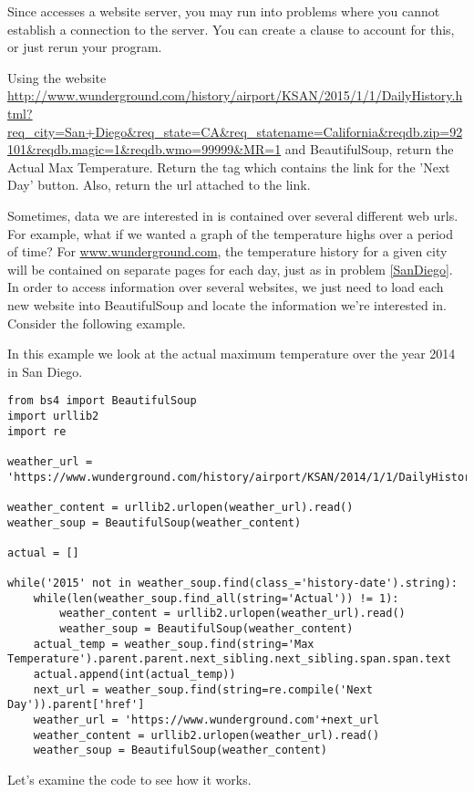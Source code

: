 \begin{warn}
Since  accesses a website server, you may run into problems where you cannot establish a connection to the server.
You can create a  clause to account for this, or just rerun your program.
\end{warn}

\begin{problem}\label{SanDiego}

Using the website \url{http://www.wunderground.com/history/airport/KSAN/2015/1/1/DailyHistory.html?req_city=San+Diego&req_state=CA&req_statename=California&reqdb.zip=92101&reqdb.magic=1&reqdb.wmo=99999&MR=1} 
and BeautifulSoup, return the Actual Max Temperature.
Return the tag which contains the link for the 'Next Day' button.
Also, return the url attached to the link.

\end{problem}

Sometimes, data we are interested in is contained over several different web urls.
For example, what if we wanted a graph of the temperature highs over a period of time?
For \url{www.wunderground.com}, the temperature history for a given city will be contained on separate pages for each day, just as in problem \ref{SanDiego}. In order to access information over several websites, we just need to load each new website into BeautifulSoup and locate the information we're interested in. Consider the following example.

In this example we look at the actual maximum temperature over the year 2014 in San Diego.
\begin{lstlisting}
from bs4 import BeautifulSoup
import urllib2
import re

weather_url = 'https://www.wunderground.com/history/airport/KSAN/2014/1/1/DailyHistory.html'

weather_content = urllib2.urlopen(weather_url).read()
weather_soup = BeautifulSoup(weather_content)

actual = []

while('2015' not in weather_soup.find(class_='history-date').string):
    while(len(weather_soup.find_all(string='Actual')) != 1):
        weather_content = urllib2.urlopen(weather_url).read()
        weather_soup = BeautifulSoup(weather_content)
    actual_temp = weather_soup.find(string='Max Temperature').parent.parent.next_sibling.next_sibling.span.span.text
    actual.append(int(actual_temp))
    next_url = weather_soup.find(string=re.compile('Next Day')).parent['href']
    weather_url = 'https://www.wunderground.com'+next_url
    weather_content = urllib2.urlopen(weather_url).read()
    weather_soup = BeautifulSoup(weather_content)

\end{lstlisting}
Let's examine the code to see how it works.

